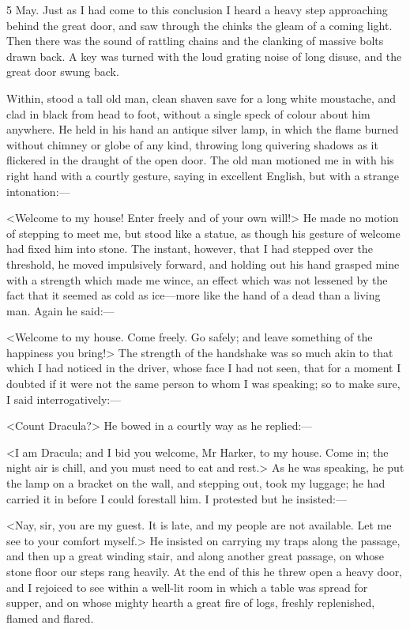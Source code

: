 \begin{diary}{5 May.}
Just as I had come to this conclusion I heard a heavy step approaching behind the great door, and saw through the chinks the gleam of a coming light. Then there was the sound of rattling chains and the clanking of massive bolts drawn back. A key was turned with the loud grating noise of long disuse, and the great door swung back.

Within, stood a tall old man, clean shaven save for a long white moustache, and clad in black from head to foot, without a single speck of colour about him anywhere. He held in his hand an antique silver lamp, in which the flame burned without chimney or globe of any kind, throwing long quivering shadows as it flickered in the draught of the open door. The old man motioned me in with his right hand with a courtly gesture, saying in excellent English, but with a strange intonation:—

<Welcome to my house! Enter freely and of your own will!> He made no motion of stepping to meet me, but stood like a statue, as though his gesture of welcome had fixed him into stone. The instant, however, that I had stepped over the threshold, he moved impulsively forward, and holding out his hand grasped mine with a strength which made me wince, an effect which was not lessened by the fact that it seemed as cold as ice—more like the hand of a dead than a living man. Again he said:—

<Welcome to my house. Come freely. Go safely; and leave something of the happiness you bring!> The strength of the handshake was so much akin to that which I had noticed in the driver, whose face I had not seen, that for a moment I doubted if it were not the same person to whom I was speaking; so to make sure, I said interrogatively:—

<Count Dracula?> He bowed in a courtly way as he replied:—

<I am Dracula; and I bid you welcome, Mr Harker, to my house. Come in; the night air is chill, and you must need to eat and rest.> As he was speaking, he put the lamp on a bracket on the wall, and stepping out, took my luggage; he had carried it in before I could forestall him. I protested but he insisted:—

<Nay, sir, you are my guest. It is late, and my people are not available. Let me see to your comfort myself.> He insisted on carrying my traps along the passage, and then up a great winding stair, and along another great passage, on whose stone floor our steps rang heavily. At the end of this he threw open a heavy door, and I rejoiced to see within a well-lit room in which a table was spread for supper, and on whose mighty hearth a great fire of logs, freshly replenished, flamed and flared.


\end{diary}
